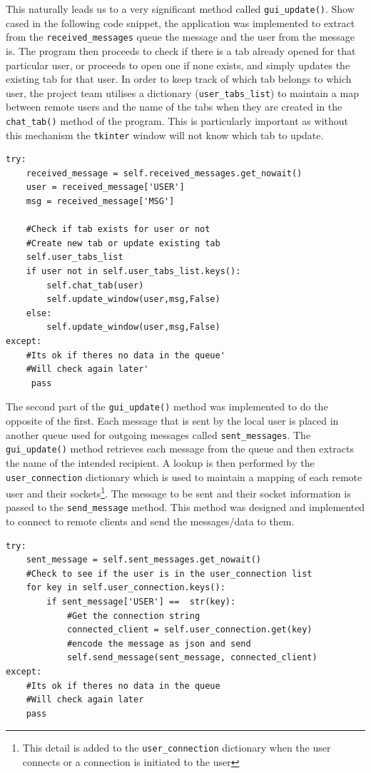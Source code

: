 \documentclass[finalReport.tex]{subfiles}
\begin{document}
This naturally leads us to a very significant method called \lstinline'gui_update()'. Show cased in the following code snippet, the application was implemented to extract from the \lstinline'received_messages' queue the message and the user from the message is. The program then proceeds to check if there is a tab already opened for that particular user, or proceeds to open one if none exists, and simply updates the existing tab for that user. In order to keep track of which tab belongs to which user, the project team utilises a dictionary (\lstinline'user_tabs_list') to maintain a map between remote users and the name of the tabs when they are created in the \lstinline'chat_tab()' method of the program. This is particularly important as without this mechanism the \lstinline'tkinter' window will not know which tab to update.


\begin{lstlisting}
try:            
    received_message = self.received_messages.get_nowait()
    user = received_message['USER']
    msg = received_message['MSG']            

    #Check if tab exists for user or not
    #Create new tab or update existing tab
    self.user_tabs_list
    if user not in self.user_tabs_list.keys():                    
        self.chat_tab(user)
		self.update_window(user,msg,False)
    else:
        self.update_window(user,msg,False)
except: 
    #Its ok if theres no data in the queue'
    #Will check again later'
     pass
\end{lstlisting}

The second part of the \lstinline'gui_update()' method was implemented to do the opposite of the first. Each message that is sent by the local user is placed in another queue used for outgoing messages called \lstinline'sent_messages'. The \lstinline'gui_update()' method retrieves each message from the queue and then extracts the name of the intended recipient. A lookup is then performed by the \lstinline'user_connection' dictionary which is used to maintain a mapping of each remote user and their sockets\footnote{This detail is added to the \lstinline'user_connection' dictionary when the user connects or a connection is initiated to the user}. The message to be sent and their socket information is passed to the \lstinline'send_message' method. This method was designed and implemented to connect to remote clients  and send the messages/data to them.

\begin{lstlisting}
try:            
	sent_message = self.sent_messages.get_nowait()
	#Check to see if the user is in the user_connection list            
	for key in self.user_connection.keys():           
	    if sent_message['USER'] ==  str(key):
	        #Get the connection string
	        connected_client = self.user_connection.get(key)                                
	        #encode the message as json and send
	        self.send_message(sent_message, connected_client)
except:
	#Its ok if theres no data in the queue
	#Will check again later
	pass
\end{lstlisting}
\end{document}
